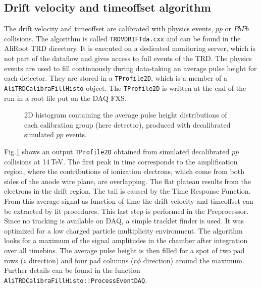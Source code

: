 \documentclass{alicetdr}
\begin{document}
\subsection{Drift velocity and timeoffset algorithm}
The drift velocity and timeoffset are calibrated with physics events, 
$pp$ or $PbPb$ collisions. The algorithm is called 
{\tt TRDVDRIFTda.cxx} and can be found in the AliRoot TRD directory. 
It is executed on a dedicated monitoring server, which is not part 
of the dataflow and gives access to full events of the TRD. The 
physics events are used to fill continuously during data-taking an 
average pulse height for each detector. They are stored in a 
{\tt TProfile2D}, which is a member of a { \tt AliTRDCalibraFillHisto} 
object. The {\tt TProfile2D} is written at the end of the run in a 
root file put on the DAQ FXS.\\
\begin{figure}[h]
  \centering\mbox{}
  \caption{\label{referenceph2d}2D histogram containing the average 
pulse height distributions of each calibration group (here detector), 
produced with decalibrated simulated $pp$ events.}
\end{figure}

Fig.\ref{referenceph2d} shows an output {\tt TProfile2D} obtained 
from simulated decalibrated $pp$ collisions at 14\,TeV. The first 
peak in time corresponds to the amplification region, where the 
contributions of ionization electrons, which come from both sides 
of the anode wire plane, are overlapping. The flat plateau results 
from the electrons in the drift region. The tail is caused by the 
Time Response Function. From this average signal as function of time 
the drift velocity and timeoffset can be extracted by fit procedures. 
This last step is performed in the Preprocessor.\\
Since no tracking is available on DAQ, a simple tracklet finder is 
used. It was optimized for a low charged particle multiplicity 
environment. The algorithm looks for a maximum of the signal 
amplitudes in the chamber after integration over all timebins. The 
average pulse height is then filled for a spot of two pad rows 
($z$ direction) and four pad columns ($r\phi$ direction) around the 
maximum. Further details can be found in the function 
{\tt AliTRDCalibraFillHisto::ProcessEventDAQ}.
%
\end{document}

